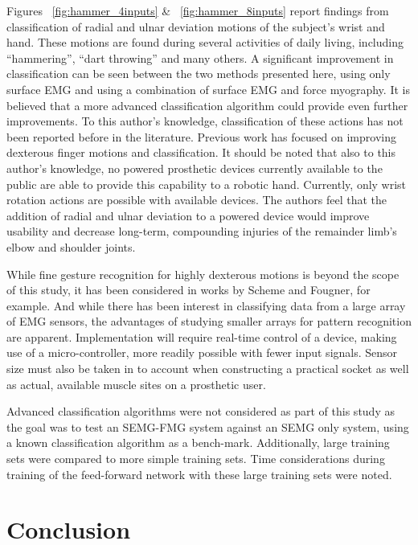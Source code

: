 \documentclass[twocolumn]{sagej}
\begin{document}
Figures ~\ref{fig:hammer_4inputs} \& ~\ref{fig:hammer_8inputs} report findings from classification of radial and ulnar deviation motions of the subject's wrist and hand.  These motions are found during several activities of daily living, including ``hammering'', ``dart throwing'' and many others.  A significant improvement in classification can be seen between the two methods presented here, using only surface EMG and using a combination of surface EMG and force myography.  It is believed that a more advanced classification algorithm could provide even further improvements. To this author's knowledge, classification of these actions has not been reported before in the literature.  Previous work has focused on improving dexterous finger motions and classification.  It should be noted that also to this author's knowledge, no powered prosthetic devices currently available to the public are able to provide this capability to a robotic hand. Currently, only  wrist rotation actions are possible with available devices. The authors feel that the addition of radial and ulnar deviation to a powered device would improve usability and decrease long-term, compounding injuries of the remainder limb's elbow and shoulder joints.\par \noindent
While fine gesture recognition for highly dexterous motions is beyond the scope of this study, it has been considered in works by Scheme and Fougner, for example.  And while there has been interest in classifying data from a large array of EMG sensors, the advantages of studying smaller arrays for pattern recognition are apparent.  Implementation will require real-time control of a device, making use of a micro-controller, more readily possible with fewer input signals.  Sensor size must also be taken in to account when constructing a practical socket as well as actual, available muscle sites on a prosthetic user. \par \noindent
Advanced classification algorithms were not considered as part of this study as the goal was to test an SEMG-FMG system against an SEMG only system, using a known classification algorithm as a bench-mark. Additionally, large training sets were compared to more simple training sets.  Time considerations during training of the feed-forward network with these large training sets were noted.  

\section{Conclusion}
\label{sec:conclusion}
\end{document}
